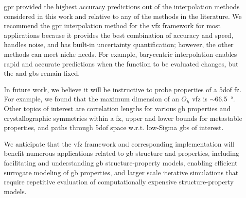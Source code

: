 \documentclass[final,twocolumn,12pt]{elsarticle}
\begin{document}
\Gls{gpr} provided the highest accuracy predictions out of the interpolation methods considered in this work and relative to any of the methods in the literature. %
We recommend the \gls{gpr} interpolation method for the \gls{vfz} framework for most applications because it provides the best combination of accuracy and speed, handles \inpt{} noise, and has built-in uncertainty quantification; however, the other methods can meet niche needs. For example, barycentric interpolation enables rapid and accurate predictions when the function to be evaluated changes, but the \inpt{} and \outpt{} \glspl{gb} remain fixed.

In future work, we believe it will be instructive to probe properties of a \gls{5dof} \gls{fz}. For example, we found that the maximum dimension of an $O_h$ \gls{vfz} is $\sim$\SI{66.5}{\degree}. Other topics of interest are correlation lengths for various \gls{gb} properties and crystallographic symmetries within a \gls{fz}, upper and lower bounds for metastable properties, and paths through \gls{5dof} space w.r.t. low-Sigma \glspl{gb} of interest.

We anticipate that the \gls{vfz} framework and corresponding implementation will benefit numerous applications related to \gls{gb} structure and properties, including facilitating and understanding \gls{gb} structure-property models, enabling efficient surrogate modeling of \gls{gb} properties, and larger scale iterative simulations that require repetitive evaluation of computationally expensive structure-property models.

\printglossary[title={Abbreviations}]
\end{document}
